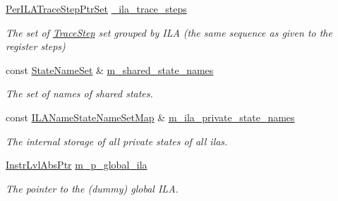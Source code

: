 \begin{DoxyCompactItemize}
\mbox{\label{classilang_1_1_memory_model_a8af93c7a3e6f717ceaec8d1d49091bc8}} 
\mbox{\hyperlink{classilang_1_1_memory_model_a63c54f7a6de8ceaa63ae12038ca6abd0}{Per\+I\+L\+A\+Trace\+Step\+Ptr\+Set}} \mbox{\hyperlink{classilang_1_1_memory_model_a8af93c7a3e6f717ceaec8d1d49091bc8}{\+\_\+ila\+\_\+trace\+\_\+steps}}
\begin{DoxyCompactList}\small\item\em The set of \mbox{\hyperlink{classilang_1_1_trace_step}{Trace\+Step}} set grouped by I\+LA (the same sequence as given to the register steps) \end{DoxyCompactList}\item 
\mbox{\label{classilang_1_1_memory_model_a22031c0f94dc0ce29835f72ce9b787e6}} 
const \mbox{\hyperlink{classilang_1_1_memory_model_a0950692c6a72496a2dda46aa985cb337}{State\+Name\+Set}} \& \mbox{\hyperlink{classilang_1_1_memory_model_a22031c0f94dc0ce29835f72ce9b787e6}{m\+\_\+shared\+\_\+state\+\_\+names}}
\begin{DoxyCompactList}\small\item\em The set of names of shared states. \end{DoxyCompactList}\item 
\mbox{\label{classilang_1_1_memory_model_ab8b90cdb59bbe77b0ab979c3a23b7300}} 
const \mbox{\hyperlink{classilang_1_1_memory_model_a9e23cd7d325902a4ab1a4f5d8acea67b}{I\+L\+A\+Name\+State\+Name\+Set\+Map}} \& \mbox{\hyperlink{classilang_1_1_memory_model_ab8b90cdb59bbe77b0ab979c3a23b7300}{m\+\_\+ila\+\_\+private\+\_\+state\+\_\+names}}
\begin{DoxyCompactList}\small\item\em The internal storage of all private states of all ilas. \end{DoxyCompactList}\item 
\mbox{\label{classilang_1_1_memory_model_a71b7cbd5cb5f885434f085847c7305ed}} 
\mbox{\hyperlink{namespaceilang_ad1b30fdf347e493b3937143da05d1a72}{Instr\+Lvl\+Abs\+Ptr}} \mbox{\hyperlink{classilang_1_1_memory_model_a71b7cbd5cb5f885434f085847c7305ed}{m\+\_\+p\+\_\+global\+\_\+ila}}
\begin{DoxyCompactList}\small\item\em The pointer to the (dummy) global I\+LA. \end{DoxyCompactList}\item 

\end{DoxyCompactItemize}
